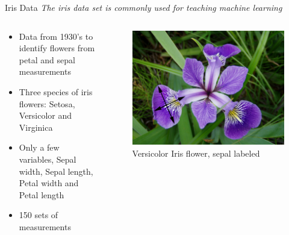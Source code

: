 \documentclass[10pt]{beamer}
\begin{document}
\begin{frame}{Iris Data}
\emph{The iris data set is commonly used for teaching machine learning}
	\begin{columns}
	\begin{column}{0.5\textwidth}
	\begin{itemize}
		\item Data from 1930's to identify flowers from petal and sepal measurements
		\item Three species of iris flowers: Setosa, Versicolor and Virginica
		\item Only a few variables, Sepal width, Sepal length, Petal width and Petal length
		\item 150 sets of measurements 
	\end{itemize}
	\end{column}
	\begin{column}{0.5\textwidth}
		\begin{figure}	
			\caption{Versicolor Iris flower, sepal labeled}
			\includegraphics[width=1.0\textwidth, center, trim=0cm 0cm 0 0cm]{images/Iris_versicolor_arrows.jpg}
	\end{figure}
	\end{column}
	\end{columns}
\end{frame}
\end{document}
